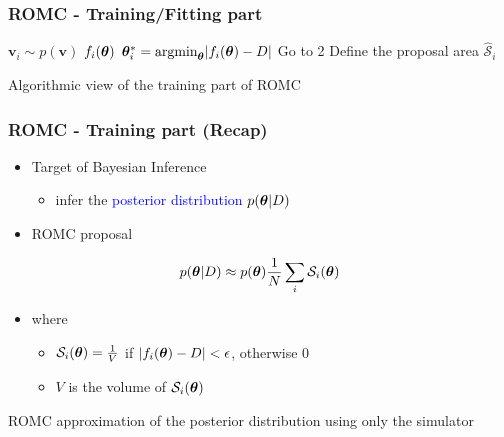 \begin{frame}
  \frametitle{ROMC - Training/Fitting part}
  \begin{algorithmic}[1]
      \State $\mathbf{v}_i \sim p(\mathbf{v})$ 
      \State $f_i(\boldsymbol{\theta})$ 
      \State $\boldsymbol{\theta}_i^* = \text{argmin}_{\boldsymbol{\theta}} |f_i(\boldsymbol{\theta}) - D|$ 
        \State Go to 2 
      \EndIf
      \State Define the proposal area $\mathcal{\hat{S}}_i$ 
    \EndFor
    \EndProcedure
  \end{algorithmic}

  \noindent\makebox[\linewidth]{\rule{\paperwidth}{0.4pt}}
  Algorithmic view of the training part of ROMC
\end{frame}

\begin{frame}
  \frametitle{ROMC - Training part (Recap)}

  \begin{itemize}
  \item Target of Bayesian Inference
    \begin{itemize}
    \item infer the \textcolor{blue}{posterior distribution $p(\boldsymbol{\theta}|D)$}
    \end{itemize}
  \item ROMC proposal
    \end{itemize}
    \begin{equation}
      p(\boldsymbol{\theta}|D) \approx p(\boldsymbol{\theta}) \frac{1}{N} \sum_i \mathcal{S}_i(\boldsymbol{\theta})
    \end{equation}

    \begin{itemize}
    \item where
      \begin{itemize}
      \item $\mathcal{S}_i(\boldsymbol{\theta}) = \frac{1}{V}$ if $|f_i(\boldsymbol{\theta}) - D| < \epsilon$, otherwise $0$
      \item $V$ is the volume of $\mathcal{S}_i(\boldsymbol{\theta})$
      \end{itemize}
    \end{itemize}
  \noindent\makebox[\linewidth]{\rule{\paperwidth}{0.4pt}}
  ROMC approximation of the posterior distribution using only the simulator
\end{frame}

